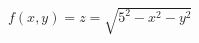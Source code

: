 \documentclass[preview]{standalone}
\begin{document}
\begin{center}
$f(x,y)=z=\sqrt{5^2-x^2-y^2}$
\end{center}
\end{document}

